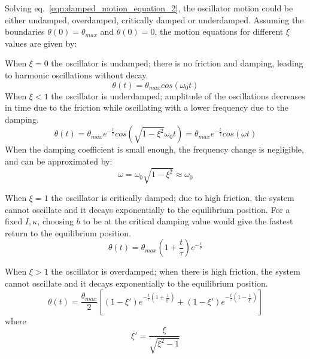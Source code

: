 \documentclass[\main/master.tex]{subfiles}
\begin{document}
\par\noindent
Solving eq.~\ref{eqn:damped_motion_equation_2}, the oscillator motion could be either undamped, overdamped, critically damped or underdamped. Assuming the boundaries $\theta(0) = \theta_{max}$ and $\dot{\theta}(0) = 0$, the motion equations for different $\xi$ values are given by:
\par\noindent
When $\xi = 0$ the oscillator is undamped; there is no friction and damping, leading to harmonic oscillations without decay.
\begin{equation}
\theta(t) = \theta_{max}cos(\omega_0 t )    \label{eqn:undamped_motion_equation_2}
\end{equation}
When $\xi < 1$ the oscillator is underdamped; amplitude of the oscillations decreases in time due to the friction while oscillating with a lower frequency due to the damping. 
\begin{equation}
\theta(t) = \theta_{max} e^{-\frac{t}{\tau}}cos(\sqrt{1-\xi^2}\omega_0 t ) =  \theta_{max} e^{-\frac{t}{\tau}}cos(\omega t )    \label{eqn:underdamped_motion_equation}
\end{equation}
When the damping coefficient is small enough, the frequency change is negligible, and can be approximated by:
\begin{equation}
\omega = \omega_0\sqrt{1-\xi^2}\approx\omega_0    \label{eqn:underdamped_frequency}
\end{equation}
\par\noindent
When $\xi = 1$ the oscillator is critically damped; due to high friction, the system cannot oscillate and it decays exponentially to the equilibrium position. For a fixed $I, \kappa$, choosing $b$ to be at the critical damping value would give the fastest return to the equilibrium position. 
\begin{equation}
\theta(t) = \theta_{max}(1+\frac{t}{\tau}) e^{-\frac{t}{\tau}}     \label{eqn:critically_damped_motion_equation}
\end{equation}
\par\noindent
When $\xi > 1$ the oscillator is overdamped; when there is high friction, the system cannot oscillate and it decays exponentially to the equilibrium position. 
\begin{equation}
\theta(t) = \frac{\theta_{max}}{2} [ (1-\xi')e^{-\frac{t}{\tau}(1+\frac{1}{\xi'})} +(1-\xi')e^{-\frac{t}{\tau}(1-\frac{1}{\xi'})} ]
\label{eqn:overdamped_motion_equation}
\end{equation}
where 
\begin{equation}
\xi'  = \frac{\xi}{\sqrt{\xi^2 - 1}}  \label{eqn:overdamped_motion_equation_coefficient}
\end{equation}
\end{document}
